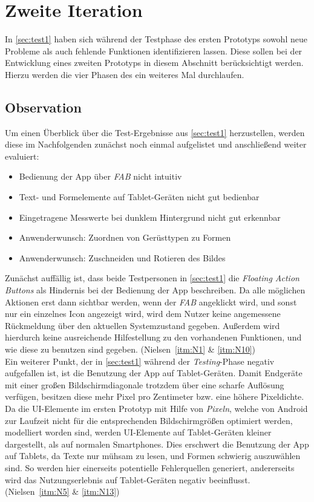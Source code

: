 \chapter{Zweite Iteration}\label{chap:pro2}
In \autoref{sec:test1} haben sich während der Testphase des ersten Prototyps sowohl neue Probleme als auch fehlende Funktionen identifizieren lassen.
Diese sollen bei der Entwicklung eines zweiten Prototyps in diesem Abschnitt berücksichtigt werden. 
Hierzu werden die vier Phasen des \hcdp{} ein weiteres Mal durchlaufen.

\section{Observation}
Um einen Überblick über die Test-Ergebnisse aus \autoref{sec:test1} herzustellen, werden diese im Nachfolgenden zunächst noch einmal aufgelistet und anschließend weiter evaluiert:

\begin{itemize}
  \item Bedienung der App über \emph{FAB} nicht intuitiv
  \item Text- und Formelemente auf Tablet-Geräten nicht gut bedienbar
  \item Eingetragene Messwerte bei dunklem Hintergrund nicht gut erkennbar
  \item Anwenderwunsch: Zuordnen von Gerüsttypen zu Formen
  \item Anwenderwunsch: Zuschneiden und Rotieren des Bildes
\end{itemize}

\noindent
Zunächst auffällig ist, dass beide Testpersonen in \autoref{sec:test1} die \emph{Floating Action Buttons} als Hindernis bei der Bedienung der App beschreiben.
Da alle möglichen Aktionen erst dann sichtbar werden, wenn der \emph{FAB} angeklickt wird, und sonst nur ein einzelnes Icon angezeigt wird, wird dem Nutzer keine angemessene Rückmeldung über den aktuellen Systemzustand gegeben.
Außerdem wird hierdurch keine ausreichende Hilfestellung zu den vorhandenen Funktionen, und wie diese zu benutzen sind gegeben.
(Nielsen~\autoref{itm:N1} \& \autoref{itm:N10}) \\

Ein weiterer Punkt, der in \autoref{sec:test1} während der \emph{Testing}-Phase negativ aufgefallen ist, ist die Benutzung der App auf Tablet-Geräten.
Damit Endgeräte mit einer großen Bildschirmdiagonale trotzdem über eine scharfe Auflösung verfügen, besitzen diese mehr Pixel pro Zentimeter bzw. eine höhere Pixeldichte.
Da die UI-Elemente im ersten Prototyp mit Hilfe von \emph{Pixeln}, welche von Android zur Laufzeit nicht für die entsprechenden Bildschirmgrößen optimiert werden, modelliert worden sind, werden UI-Elemente auf Tablet-Geräten kleiner dargestellt, als auf normalen Smartphones.
Dies erschwert die Benutzung der App auf Tablets, da Texte nur mühsam zu lesen, und Formen schwierig auszuwählen sind.
So werden hier einerseits potentielle Fehlerquellen generiert, andererseits wird das Nutzungserlebnis auf Tablet-Geräten negativ beeinflusst.
(Nielsen~\autoref{itm:N5} \& \autoref{itm:N13}) \\

